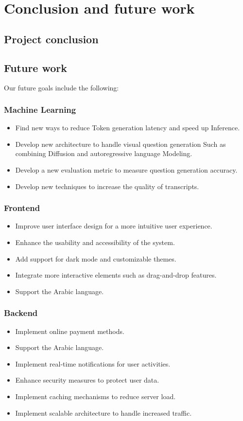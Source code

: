 \chapter{Conclusion and future work}

\section{Project conclusion}

\section{Future work}

Our future goals include the following:
\subsection{Machine Learning}
\begin{itemize}
    \item Find new ways to reduce Token generation latency and speed up Inference.
    \item Develop new architecture to handle visual question generation Such as combining Diffusion and autoregressive language Modeling.
    \item Develop a new evaluation metric to measure question generation accuracy.
    \item Develop new techniques to increase the quality of transcripts.
\end{itemize}

\subsection{Frontend}
\begin{itemize}
    \item Improve user interface design for a more intuitive user experience.
    \item Enhance the usability and accessibility of the system.
    \item Add support for dark mode and customizable themes.
    \item Integrate more interactive elements such as drag-and-drop features.
    \item Support the Arabic language.
\end{itemize}

\subsection{Backend}
\begin{itemize}
    \item Implement online payment methods.
    \item Support the Arabic language.
    \item Implement real-time notifications for user activities.
    \item Enhance security measures to protect user data.
    \item Implement caching mechanisms to reduce server load.
    \item Implement scalable architecture to handle increased traffic.
\end{itemize}